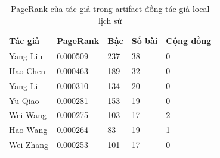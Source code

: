 \begin{table}[htbp]
\centering
\small
\caption{PageRank của tác giả trong artifact đồng tác giả local lịch sử}
\label{tab:graph_influencers}
\begin{tabularx}{\textwidth}{|L|L|p{1.2cm}|p{1.2cm}|L|}
\hline
\textbf{Tác giả} & \textbf{PageRank} & \textbf{Bậc} & \textbf{Số bài} & \textbf{Cộng đồng} \\
\hline
Yang Liu & 0.000509 & 237 & 38 & 0 \\
\hline
Hao Chen & 0.000463 & 189 & 32 & 0 \\
\hline
Yang Li & 0.000310 & 134 & 20 & 0 \\
\hline
Yu Qiao & 0.000281 & 153 & 19 & 0 \\
\hline
Wei Wang & 0.000275 & 103 & 17 & 2 \\
\hline
Hao Wang & 0.000264 & 83 & 19 & 1 \\
\hline
Wei Zhang & 0.000253 & 101 & 17 & 0 \\
\hline
\end{tabularx}
\end{table}
